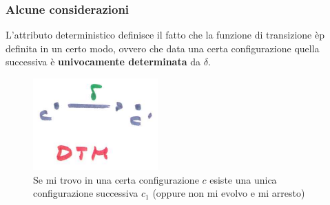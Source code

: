 \documentclass{article}
\begin{document}
\subsubsection{Alcune considerazioni}
L'attributo deterministico definisce il fatto che la funzione di transizione èp definita in un
certo modo, ovvero che data una certa configurazione quella successiva è
\textbf{univocamente determinata} da $\delta$.
\begin{figure}[H]
    \centering
    \includegraphics[scale=0.6]{images/dtm_def.png}
    \caption{Se mi trovo in una certa configurazione $c$ esiste una unica configurazione
    successiva $c_1$ (oppure non mi evolvo e mi arresto)}
\end{figure}
\end{document}
